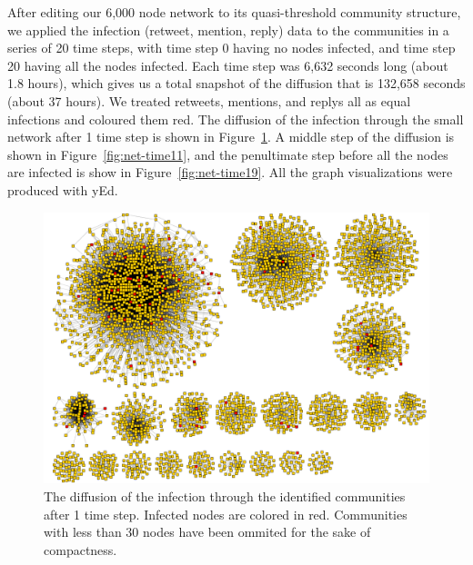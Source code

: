 \documentclass[12pt, oneside, openany]{article} %
\begin{document}
After editing our 6,000 node network to its quasi-threshold community structure, we applied the infection (retweet, mention, reply) data to the communities in a series of 20 time steps, with time step 0 having no nodes infected, and time step 20 having all the nodes infected. Each time step was 6,632 seconds long (about 1.8 hours), which gives us a total snapshot of the diffusion that is 132,658 seconds (about 37 hours). We treated retweets, mentions, and replys all as equal infections and coloured them red. The diffusion of the infection through the small network after 1 time step is shown in Figure~\ref{fig:net-time1}. A middle step of the diffusion is shown in Figure~\ref{fig:net-time11}, and the penultimate step before all the nodes are infected is show in Figure~\ref{fig:net-time19}. All the graph visualizations were produced with yEd.

\begin{figure}
\centering
    \includegraphics[scale=0.25]{step1.png}
    \caption{The diffusion of the infection through the identified communities after 1 time step. Infected nodes are colored in red. Communities with less than 30 nodes have been ommited for the sake of compactness.}
    \label{fig:net-time1}
\end{figure}
\end{document}
